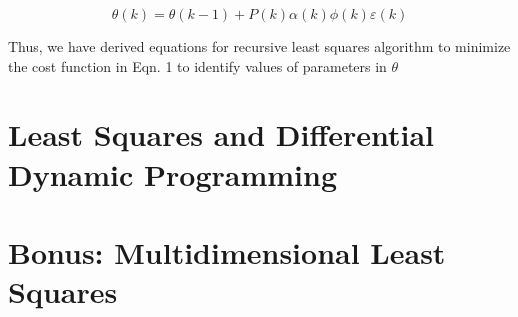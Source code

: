 \documentclass{article}
\begin{document}
\begin{equation}
\theta(k) = \theta(k-1) + P(k) \alpha(k) \phi(k) \varepsilon(k)
\end{equation}

Thus, we have derived equations for recursive least squares algorithm to minimize the cost function in Eqn. 1 to identify values of parameters in $\theta$

\section{Least Squares and Differential Dynamic Programming}

\section{Bonus: Multidimensional Least Squares}
\end{document}
